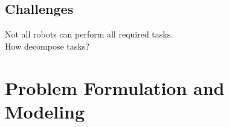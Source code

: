 \documentclass[a4paper]{article}
\begin{document}
\subsection{Challenges}
Not all robots can perform all required tasks.\\
How decompose tasks?\\





%

\section{Problem Formulation and Modeling}


%
%

\end{document}
